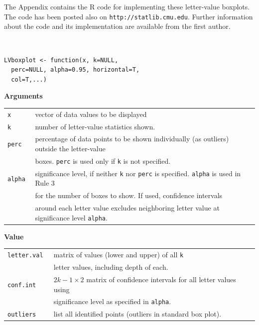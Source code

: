 \documentclass[11pt]{article}
\begin{document}
The Appendix contains the R code for implementing these
letter-value boxplots.  The code has been posted also on
\texttt{http://statlib.cmu.edu}.
Further information about the code and its implementation
are available from the first author.

{\tt
\begin{verbatim}
LVboxplot <- function(x, k=NULL, 
  perc=NULL, alpha=0.95, horizontal=T, 
  col=T,...) 
\end{verbatim}}

\noindent
\textbf{Arguments}

\medskip \noindent
\begin{tabular}{l l }
\tt x & vector of data values to be displayed \\
\tt k & number of letter-value statistics shown. \\
\tt perc & percentage of data points to be shown individually 
            (as outliers) outside the letter-value \\
         & boxes.  {\tt perc} is used only if {\tt k} is not specified.\\
\tt alpha & significance level, if neither {\tt k} 
            nor {\tt perc} is specified.  {\tt alpha} is used in Rule 3 \\
          & for the number of boxes to show.  If used, confidence intervals \\
          & around each letter value  excludes neighboring letter value 
          at significance level {\tt alpha}. 
\end{tabular}

\bigskip \noindent
\textbf{Value}

\medskip \noindent
\begin{tabular}{l l}
\tt letter.val & matrix of values (lower and upper) of all {\tt k}  \\
               & letter values, including depth of each.\\
\tt conf.int & $2k-1 \times 2$ matrix of confidence intervals for 
                         all letter values using \\
             & significance level as specified in {\tt alpha}.\\ 
\tt outliers & list all identified points (outliers 
in standard box plot).\\
\end{tabular}



\end{document}
